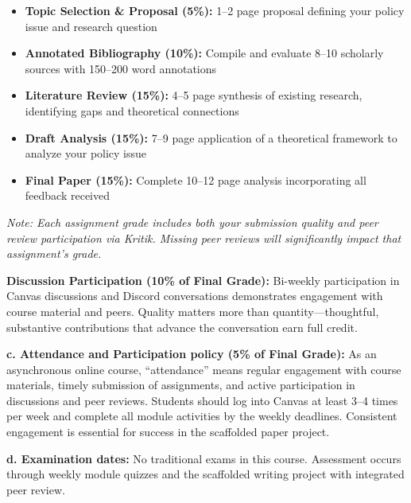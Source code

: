 \documentclass[12pt]{article}     %
\begin{document}
\begin{itemize}
\item \textbf{Topic Selection \& Proposal (5\%):} 1--2 page proposal defining your policy issue and research question
\item \textbf{Annotated Bibliography (10\%):} Compile and evaluate 8--10 scholarly sources with 150--200 word annotations
\item \textbf{Literature Review (15\%):} 4--5 page synthesis of existing research, identifying gaps and theoretical connections
\item \textbf{Draft Analysis (15\%):} 7--9 page application of a theoretical framework to analyze your policy issue
\item \textbf{Final Paper (15\%):} Complete 10--12 page analysis incorporating all feedback received
\end{itemize}

\textit{Note: Each assignment grade includes both your submission quality and peer review participation via Kritik. Missing peer reviews will significantly impact that assignment's grade.}

\vspace{0.5em}
\noindent \textbf{Discussion Participation (10\% of Final Grade):} Bi-weekly participation in Canvas discussions and Discord conversations demonstrates engagement with course material and peers. Quality matters more than quantity---thoughtful, substantive contributions that advance the conversation earn full credit.

\vspace{1em}
\noindent \textbf{c. Attendance and Participation policy (5\% of Final Grade):}
As an asynchronous online course, ``attendance'' means regular engagement with course materials, timely submission of assignments, and active participation in discussions and peer reviews. Students should log into Canvas at least 3--4 times per week and complete all module activities by the weekly deadlines. Consistent engagement is essential for success in the scaffolded paper project.

\vspace{1em}
\noindent \textbf{d. Examination dates:}
No traditional exams in this course. Assessment occurs through weekly module quizzes and the scaffolded writing project with integrated peer review.
\end{document}
